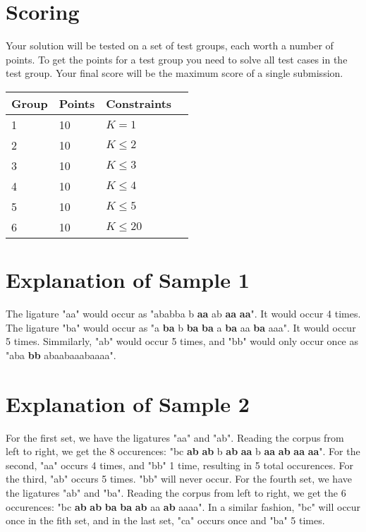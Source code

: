 \section*{Scoring}
Your solution will be tested on a set of test groups, each worth a number of points.
To get the points for a test group you need to solve all test cases in the test group.
Your final score will be the maximum score of a single submission.

\noindent
\begin{tabular}{| l | l | l | l |}
\hline
Group & Points & Constraints \\ \hline
1     & 10     & $K = 1$ \\ \hline
2     & 10     & $K \le 2$ \\ \hline
3     & 10     & $K \le 3$ \\ \hline
4     & 10     & $K \le 4$ \\ \hline
5     & 10     & $K \le 5$ \\ \hline
6     & 10     & $K \le 20$ \\ \hline
\end{tabular}

\section*{Explanation of Sample 1}
The ligature "aa" would occur as "ababba  b \textbf{aa} ab \textbf{aa} \textbf{aa}". It would occur 4 times. 
The ligature "ba" would occur as "a \textbf{ba} b \textbf{ba} \textbf{ba} a \textbf{ba} aa \textbf{ba} aaa". It would occur 5 times. 
Simmilarly, "ab" would occur 5 times, and "bb" would only occur once as "aba \textbf{bb} abaabaaabaaaa".

\section*{Explanation of Sample 2}
For the first set, we have the ligatures "aa" and "ab". Reading the corpus from left to right, we get the 8 occurences: 
"bc \textbf{ab} \textbf{ab} b \textbf{ab} \textbf{aa} b \textbf{aa} \textbf{ab} \textbf{aa} \textbf{aa}".
For the second, "aa" occurs 4 times, and "bb" 1 time, resulting in 5 total occurences.
For the third, "ab" occurs 5 times. "bb" will never occur.
For the fourth set, we have the ligatures "ab" and "ba". Reading the corpus from left to right, we get the 6 occurences: 
"bc \textbf{ab} \textbf{ab} \textbf{ba} \textbf{ba} \textbf{ab} aa \textbf{ab} aaaa".
In a similar fashion, "bc" will occur once in the fith set, and in the last set, "ca" occurs once and "ba" 5 times. 
